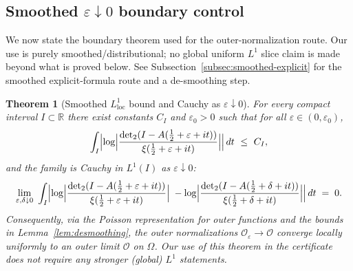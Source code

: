 \documentclass[11pt]{article}
\newtheorem{theorem}{Theorem}
\theoremstyle{definition}
\theoremstyle{remark}
\newcommand{\R}{\mathbb{R}}
\DeclareMathOperator{\dettwo}{det_2}
\begin{document}
\subsection{Smoothed \(\varepsilon\downarrow 0\) boundary control}\label{subsec:uniform-eps}
We now state the boundary theorem used for the outer-normalization route. Our use is purely smoothed/distributional; no global uniform $L^1$ slice claim is made beyond what is proved below. See Subsection~\ref{subsec:smoothed-explicit} for the smoothed explicit-formula route and a de-smoothing step.

\begin{theorem}[Smoothed $L^1_{\mathrm{loc}}$ bound and Cauchy as \(\varepsilon\downarrow 0\)]\label{thm:uniform-eps}
For every compact interval $I\subset\R$ there exist constants $C_I$ and \(\varepsilon_0>0\) such that for all \(\varepsilon\in(0,\varepsilon_0)\),
\[
 \int_I \Bigl|\log\Bigl|\frac{\dettwo(I-A(\tfrac12+\varepsilon+it))}{\xi(\tfrac12+\varepsilon+it)}\Bigr|\Bigr|\,dt\ \le\ C_I,
\]
and the family is Cauchy in $L^1(I)$ as \(\varepsilon\downarrow 0\):
\[
 \lim_{\substack{\varepsilon,\delta\downarrow 0}}\ \int_I \Bigl|\log\Bigl|\frac{\dettwo(I-A(\tfrac12+\varepsilon+it))}{\xi(\tfrac12+\varepsilon+it)}\Bigr|\;-
 \log\Bigl|\frac{\dettwo(I-A(\tfrac12+\delta+it))}{\xi(\tfrac12+\delta+it)}\Bigr|\Bigr|\,dt\;=\;0.
\]
Consequently, via the Poisson representation for outer functions and the bounds in Lemma~\ref{lem:desmoothing}, the outer normalizations \(\mathcal O_{\varepsilon}\to \mathcal O\) converge locally uniformly to an outer limit \(\mathcal O\) on \(\Omega\). Our use of this theorem in the certificate does not require any stronger (global) $L^1$ statements.
\end{theorem}
\end{document}

